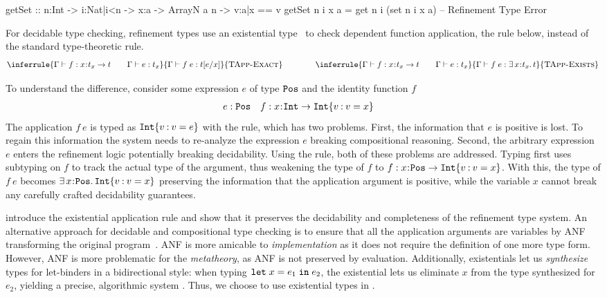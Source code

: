 \begin{code}
  getSet :: n:Int -> i:{Nat|i<n} -> x:a -> ArrayN a n -> {v:a|x == v}
  getSet n i x a = get n i (set n i x a) -- Refinement Type Error
\end{code}

For decidable type checking, refinement types use an existential type~\cite{Knowles09} to check
dependent function application, \ie the  rule below, instead
of the standard type-theoretic  rule.
%
$$
{
\inferrule%
{
    \hastype{\tcenv}{f}{\functype{x}{\stype_x}{t}} \qquad \hastype{\tcenv}{e}{\stype_x}
 }{
    \hastype{\tcenv}{\app{f}{e}}{\stype\subst{}{x}{e}}
}{\rulename{TApp-Exact}} \qquad\qquad
\inferrule%
{
    \hastype{\tcenv}{f}{\functype{x}{\stype_x}{t}} \qquad \hastype{\tcenv}{e}{\stype_x}
 }{
    \hastype{\tcenv}{\app{f}{e}}{\existype{x}{\stype_x}{\stype}}
}{\rulename{TApp-Exists}}
}
$$

To understand the difference, consider
some expression $e$ of type $\texttt{Pos}$ and the identity function $f$
%
\begin{align*}
    e&:\texttt{Pos} & f&:x\hspace{0.05em}{:}\hspace{0.05em} \texttt{Int} \rightarrow {\ensuremath{{\texttt{Int}}\{v \mathbin{:} v = x\}}}
\end{align*}
%
The application $f\ e$ is typed as ${{\texttt{Int}}\{v \mathbin{:} v = e\}}$ with the  rule,
which has two problems.
%
First, the information that $e$ is positive is lost.
%
To regain this information the system needs to re-analyze the expression $e$
breaking compositional reasoning.
%
Second, the arbitrary expression $e$ enters the refinement logic
potentially breaking decidability.
%
Using the  rule, both of these problems are addressed.
Typing first uses subtyping on $f$ to track the actual type of the argument,
thus weakening the type of $f$ to $f:x\hspace{0.05em}{:}\hspace{0.05em} \texttt{Pos} \rightarrow {\ensuremath{{\texttt{Int}}\{v \mathbin{:} v = x\}}}$.
%
With this, the type of $f\ e$ becomes $\exists\, x\hspace{0.05em}{:}\hspace{0.05em} \texttt{Pos}.\, {{\texttt{Int}}\{v \mathbin{:} v = x\}}$
preserving the information that the application argument is positive,
while the variable $x$ cannot break any carefully crafted decidability guarantees.

\citet{Knowles09} introduce the existential application rule
and show that it preserves the decidability and completeness of the refinement type system.
%
An alternative approach for decidable and compositional type checking
is to ensure that all the application arguments
are variables by ANF transforming the original
program~\cite{Flanagan93}.
%
ANF is more amicable to \emph{implementation}
as it does not require the definition of one
more type form.
%
However, ANF is more problematic for the
\emph{metatheory}, as ANF is not preserved
by evaluation.
%
Additionally, existentials let us \emph{synthesize}
types for let-binders in a bidirectional style: when
typing ${{\texttt{let}}}\;x{{\;=\;}}e_1\;{{\texttt{in}}}\;e_2$, the existential lets
us eliminate $x$ from the type synthesized for
$e_2$, yielding a precise, algorithmic
system \cite{CosmanICFP17}.
%
Thus, we choose to use existential types in \sysrf.


